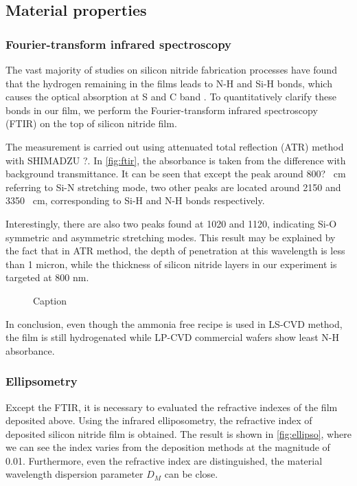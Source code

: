\subsection{Material properties}

\subsubsection{Fourier-transform infrared spectroscopy}
The vast majority of studies on silicon nitride fabrication processes have found that the hydrogen remaining in the films leads to N-H and Si-H bonds, which causes the optical absorption at S and C band \cites{Ay2004, Agnihotri2000}. To quantitatively clarify these bonds in our film, we perform the Fourier-transform infrared spectroscopy (FTIR) on the top of silicon nitride film.

The measurement is carried out using attenuated total reflection (ATR) method with SHIMADZU ?. In \autoref{fig:ftir}, the absorbance is taken from the difference with background transmittance. It can be seen that except the peak around 800? \si{\per\cm} referring to Si-N stretching mode, two other peaks are located around 2150 and 3350 \si{\per\cm}, corresponding to Si-H and N-H bonds respectively.

Interestingly, there are also two peaks found at 1020 and 1120, indicating Si-O symmetric and asymmetric stretching modes. This result may be explained by the fact that in ATR method, the depth of penetration at this wavelength is less than 1 micron, while the thickness of silicon nitride layers in our experiment is targeted at 800 nm.


\begin{figure}
    \centering
    
    \caption{Caption}
    \label{fig:ftir}
\end{figure}

In conclusion, even though the ammonia free recipe is used in LS-CVD method, the film is still hydrogenated while LP-CVD commercial wafers show least N-H absorbance.

\subsubsection{Ellipsometry}

Except the FTIR, it is necessary to evaluated the refractive indexes of the film deposited above. Using the infrared elliposometry, the refractive index of deposited silicon nitride film is obtained. The result is shown in \autoref{fig:ellipso}, where we can see the index varies from the deposition methods at the magnitude of 0.01.
Furthermore, even the refractive index are distinguished, the material wavelength dispersion parameter $D_M$ can be close.

